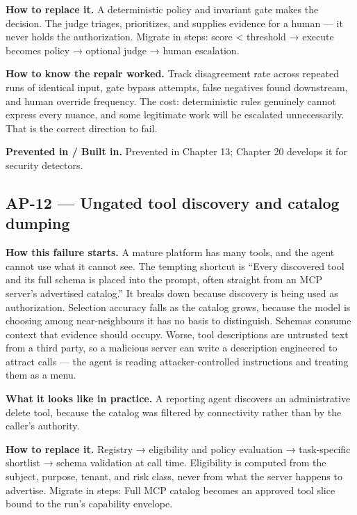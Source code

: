\textbf{How to replace it.} A deterministic policy and invariant gate makes the decision. The judge triages, prioritizes, and supplies evidence for a human — it never holds the authorization. Migrate in steps: score < threshold → execute becomes policy → optional judge → human escalation.\par

\textbf{How to know the repair worked.} Track disagreement rate across repeated runs of identical input, gate bypass attempts, false negatives found downstream, and human override frequency. The cost: deterministic rules genuinely cannot express every nuance, and some legitimate work will be escalated unnecessarily. That is the correct direction to fail.\par

\textbf{Prevented in / Built in.} Prevented in Chapter 13; Chapter 20 develops it for security detectors.\par

\subsection{AP-12 — Ungated tool discovery and catalog dumping}

\textbf{How this failure starts.} A mature platform has many tools, and the agent cannot use what it cannot see. The tempting shortcut is “Every discovered tool and its full schema is placed into the prompt, often straight from an MCP server's advertised catalog.” It breaks down because discovery is being used as authorization. Selection accuracy falls as the catalog grows, because the model is choosing among near-neighbours it has no basis to distinguish. Schemas consume context that evidence should occupy. Worse, tool descriptions are untrusted text from a third party, so a malicious server can write a description engineered to attract calls — the agent is reading attacker-controlled instructions and treating them as a menu.\par

\textbf{What it looks like in practice.} A reporting agent discovers an administrative delete tool, because the catalog was filtered by connectivity rather than by the caller's authority.\par

\textbf{How to replace it.} Registry → eligibility and policy evaluation → task-specific shortlist → schema validation at call time. Eligibility is computed from the subject, purpose, tenant, and risk class, never from what the server happens to advertise. Migrate in steps: Full MCP catalog becomes an approved tool slice bound to the run's capability envelope.\par

